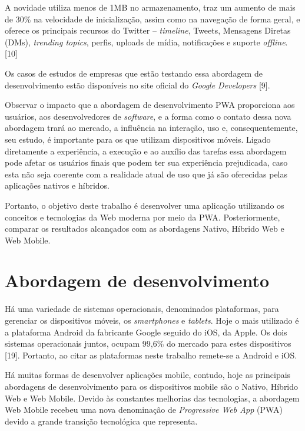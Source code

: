 \begin{citacaodireta}
A novidade utiliza menos de 1MB no armazenamento, traz um aumento de mais de 30\% na velocidade de inicialização, assim como na navegação de forma geral, e oferece os principais recursos do Twitter – \textit{timeline}, Tweets, Mensagens Diretas (DMs), \textit{trending topics}, perfis, uploads de mídia, notificações e suporte \textit{offline}. [10]
\end{citacaodireta}

Os casos de estudos de empresas que estão testando essa abordagem de desenvolvimento estão disponíveis no site oficial do \textit{Google Developers} [9].

Observar o impacto que a abordagem de desenvolvimento PWA proporciona aos usuários, aos desenvolvedores de \textit{software}, e a forma como o contato dessa nova abordagem trará ao mercado, a influência na interação, uso e, consequentemente, seu estudo, é importante para os que utilizam dispositivos móveis. Ligado diretamente a experiência, a execução e ao auxílio das tarefas essa abordagem pode afetar os usuários finais que podem ter sua experiência prejudicada, caso esta não seja coerente com a realidade atual de uso que já são oferecidas pelas aplicações nativos e híbridos.

Portanto, o objetivo deste trabalho é desenvolver uma aplicação utilizando os conceitos e tecnologias da Web moderna por meio da PWA. Posteriormente, comparar os resultados alcançados com as abordagens Nativo, Híbrido Web e Web Mobile.

\section{\esp Abordagem de desenvolvimento}

Há uma variedade de sistemas operacionais, denominados plataformas, para gerenciar os dispositivos móveis, os \textit{smartphones} e \textit{tablets}. Hoje o mais utilizado é a plataforma Android da fabricante Google seguido do iOS, da Apple. Os dois sistemas operacionais juntos, ocupam 99,6\% do mercado para estes dispositivos [19]. Portanto, ao citar as plataformas neste trabalho remete-se a Android e iOS.

Há muitas formas de desenvolver aplicações mobile, contudo, hoje as principais abordagens de desenvolvimento para os dispositivos mobile são o Nativo, Híbrido Web e Web Mobile. Devido às constantes melhorias das tecnologias, a abordagem Web Mobile recebeu uma nova denominação de \textit{Progressive Web App} (PWA) devido a grande transição  tecnológica que representa.

